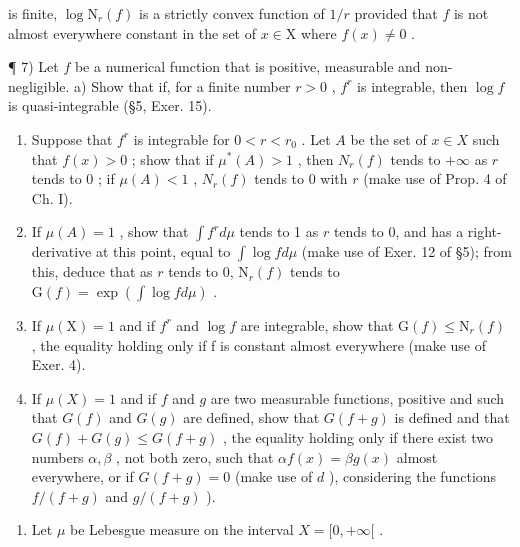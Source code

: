 is finite, \(\log \mathrm{N}_r(f)\) is a strictly convex function of \(1 / r\) provided that \(f\) is not almost everywhere constant in the set of \(x\in \mathrm{X}\) where \(f(x)\neq 0\) .

¶ 7) Let \(f\) be a numerical function that is positive, measurable and non-negligible. a) Show that if, for a finite number \(r > 0\) , \(f^r\) is integrable, then \(\log f\) is quasi-integrable (§5, Exer. 15).

\begin{enumerate}
\def\labelenumi{\alph{enumi})}
\setcounter{enumi}{1}
\item
  Suppose that \(f^r\) is integrable for \(0 < r < r_0\) . Let \(A\) be the set of \(x \in X\) such that \(f(x) > 0\) ; show that if \(\mu^*(A) > 1\) , then \(N_r(f)\) tends to \(+\infty\) as \(r\) tends to \(0\) ; if \(\mu(A) < 1\) , \(N_r(f)\) tends to \(0\) with \(r\) (make use of Prop. 4 of Ch. I).
\item
  If \(\mu(A) = 1\) , show that \(\int f^r d\mu\) tends to 1 as \(r\) tends to 0, and has a right-derivative at this point, equal to \(\int \log f d\mu\) (make use of Exer. 12 of §5); from this, deduce that as \(r\) tends to 0, \(\mathrm{N}_r(f)\) tends to \(\mathrm{G}(f) = \exp(\int \log f d\mu)\) .
\item
  If \(\mu(\mathrm{X})=1\) and if \(f^{r}\) and \(\log f\) are integrable, show that \(\mathrm{G}(f)\leqslant\mathrm{N}_{r}(f)\) , the equality holding only if f is constant almost everywhere (make use of Exer. 4).
\item
  If \(\mu(X) = 1\) and if \(f\) and \(g\) are two measurable functions, positive and such that \(G(f)\) and \(G(g)\) are defined, show that \(G(f + g)\) is defined and that \(G(f) + G(g) \leqslant G(f + g)\) , the equality holding only if there exist two numbers \(\alpha, \beta\) , not both zero, such that \(\alpha f(x) = \beta g(x)\) almost everywhere, or if \(G(f + g) = 0\) (make use of \(d\) ), considering the functions \(f/(f + g)\) and \(g/(f + g)\) ).
\end{enumerate}

\begin{enumerate}
\def\labelenumi{\arabic{enumi})}
\setcounter{enumi}{7}
\tightlist
\item
  Let \(\mu\) be Lebesgue measure on the interval \(X = [0, +\infty[\) .
\end{enumerate}

